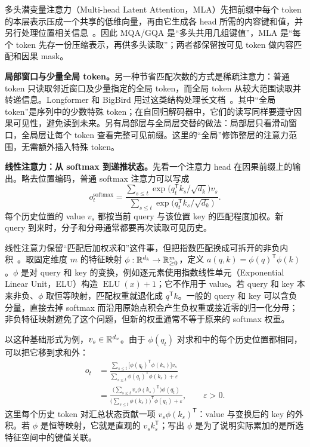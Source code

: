 多头潜变量注意力（Multi-head Latent Attention，MLA）先把前缀中每个 token 的本层表示压成一个共享的低维向量，再由它生成各 head 所需的内容键和值，并另行处理位置相关信息~\cite{deepseekv2}。因此 MQA/GQA 是“多头共用几组键值”，MLA 是“每个 token 先存一份压缩表示，再供多头读取”；两者都保留按可见 token 做内容匹配和因果 mask。

\textbf{局部窗口与少量全局 token。}另一种节省匹配次数的方式是稀疏注意力：普通 token 只读取邻近窗口及少量指定的全局 token，而全局 token 从较大范围读取并转递信息。Longformer 和 BigBird 用过这类结构处理长文档~\cite{beltagy2020longformer,zaheer2020bigbird}。其中“全局 token”是序列中的少数特殊 token；在自回归解码器中，它们的读写同样要遵守因果可见性，避免读到未来。另有局部层与全局层交替的做法：局部层只看滑动窗口，全局层让每个 token 查看完整可见前缀。这里的“全局”修饰整层的注意力范围，无需额外插入特殊 token。

\textbf{线性注意力：从 softmax 到递推状态。}先看一个注意力 head 在因果前缀上的输出。略去位置编码，普通 softmax 注意力可以写成
\begin{equation}
o_t^{\mathrm{softmax}}=
\frac{\sum_{s\le t}\exp\!\bigl(q_t^{\mathsf T}k_s/\sqrt{d_k}\bigr)v_s}
{\sum_{s\le t}\exp\!\bigl(q_t^{\mathsf T}k_s/\sqrt{d_k}\bigr)}.
\label{eq:softmax-causal-sum}
\end{equation}
每个历史位置的 value \(v_s\) 都按当前 query 与该位置 key 的匹配程度加权。新 query 到来时，分子和分母通常都要再次读取可见历史。

线性注意力保留“匹配后加权求和”这件事，但把指数匹配换成可拆开的非负内积~\cite{katharopoulos2020linear}。取固定维度 \(m\) 的特征映射 \(\phi:\mathbb{R}^{d_k}\to\mathbb{R}_{\geq0}^{m}\)，定义 \(a(q,k)=\phi(q)^{\mathsf T}\phi(k)\)。\(\phi\) 是对 query 和 key 的变换，例如逐元素使用指数线性单元（Exponential Linear Unit，ELU）构造 \(\operatorname{ELU}(x)+1\)；它不作用于 value。若 query 和 key 本来非负、\(\phi\) 取恒等映射，匹配权重就退化成 \(q^{\mathsf T}k\)。一般的 query 和 key 可以含负分量，直接去掉 softmax 而沿用原始点积会产生负权重或接近零的归一化分母；非负特征映射避免了这个问题，但新的权重通常不等于原来的 softmax 权重。

以这种基础形式为例，\(v_s\in\mathbb{R}^{d_v}\)。由于 \(\phi(q_t)\) 对求和中的每个历史位置都相同，可以把它移到求和外：
\begin{align}
o_t
&=\frac{\sum_{s\le t}\bigl[\phi(q_t)^{\mathsf T}\phi(k_s)\bigr]v_s}
{\sum_{s\le t}\phi(q_t)^{\mathsf T}\phi(k_s)+\varepsilon}
\label{eq:linear-attention-weighted}\\
&=\frac{\bigl(\sum_{s\le t}v_s\phi(k_s)^{\mathsf T}\bigr)\phi(q_t)}
{\bigl(\sum_{s\le t}\phi(k_s)\bigr)^{\mathsf T}\phi(q_t)+\varepsilon},
\qquad \varepsilon>0.
\label{eq:linear-attention-factored}
\end{align}
这里每个历史 token 对汇总状态贡献一项 \(v_s\phi(k_s)^{\mathsf T}\)：value 与变换后的 key 的外积。若 \(\phi\) 是恒等映射，它就是直观的 \(v_sk_s^{\mathsf T}\)；写出 \(\phi\) 是为了说明实际累加的是所选特征空间中的键值关联。

